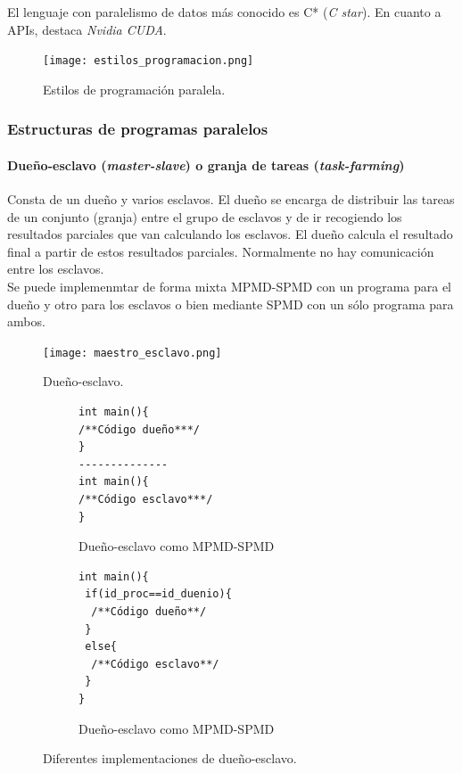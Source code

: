 \documentclass[12pt,spanish]{article}
\begin{document}
El lenguaje con paralelismo de datos más conocido es C* (\textit{C star}). En cuanto a APIs, destaca \textit{Nvidia CUDA}.

\begin{figure}[H]
	\centering
	\texttt{[image: estilos\_programacion.png]}
	\caption{Estilos de programación paralela.}
\end{figure}

\subsubsection{Estructuras de programas paralelos}

\paragraph{Dueño-esclavo (\textit{master-slave}) o granja de tareas (\textit{task-farming})}

Consta de un dueño y varios esclavos. El dueño se encarga de distribuir las tareas de un conjunto (granja) entre el grupo de esclavos y de ir recogiendo los resultados parciales que van calculando los esclavos. El dueño calcula el resultado final a partir de estos resultados parciales. Normalmente no hay comunicación entre los esclavos.\\

Se puede implemenmtar de forma mixta MPMD-SPMD con un programa para el dueño y otro para los esclavos o bien mediante SPMD con un sólo programa para ambos.

\begin{figure}[H]
	\centering
	\texttt{[image: maestro\_esclavo.png]}
	\caption{Dueño-esclavo.}
\end{figure}

\begin{figure}[H]
\centering
\begin{subfigure}[b]{0.3\textwidth}
\begin{verbatim}
int main(){
/**Código dueño***/
}
--------------
int main(){
/**Código esclavo***/
}
\end{verbatim}
\caption{Dueño-esclavo como MPMD-SPMD}
\end{subfigure}
\hspace{5cm}
\begin{subfigure}[b]{0.3\textwidth}
\begin{verbatim}
int main(){
 if(id_proc==id_duenio){
  /**Código dueño**/
 }
 else{
  /**Código esclavo**/
 }
}
\end{verbatim}
\caption{Dueño-esclavo como MPMD-SPMD}
\end{subfigure}
\caption{Diferentes implementaciones de dueño-esclavo.}
\end{figure}
\end{document}
